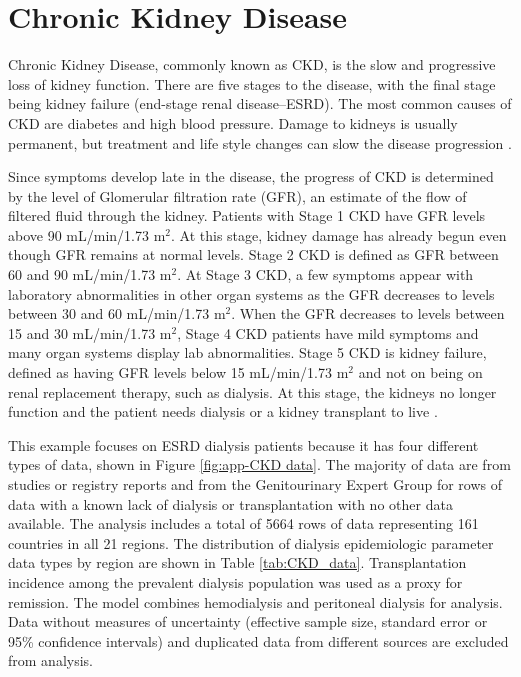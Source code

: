 \chapter{Chronic Kidney Disease}
\label{applications-fits_incon_v_con}

Chronic Kidney Disease, commonly known as CKD, is the slow and progressive loss of kidney function. There are five stages to the disease, with the final stage being kidney failure (end-stage renal disease--ESRD). The most common causes of CKD are diabetes and high blood pressure.  Damage to kidneys is usually permanent, but treatment and life style changes can slow the disease progression \cite{national_KDOQI_2002}.

Since symptoms develop late in the disease, the progress of CKD is determined by the level of Glomerular filtration rate (GFR), an estimate of the flow of filtered fluid through the kidney. Patients with Stage 1 CKD have GFR levels above 90 mL/min/1.73 m$^2$.  At this stage, kidney damage has already begun even though GFR remains at normal levels.   Stage 2 CKD is defined as GFR between 60 and 90 mL/min/1.73 m$^2$.  At Stage 3 CKD, a few symptoms appear with laboratory abnormalities in other organ systems as the GFR decreases to levels between 30 and 60 mL/min/1.73 m$^2$.  When the GFR decreases to levels between 15 and 30 mL/min/1.73 m$^2$, Stage 4 CKD patients have mild symptoms and many organ systems display lab abnormalities.  Stage 5 CKD is kidney failure, defined as having GFR levels below 15 mL/min/1.73 m$^2$ and not on being on renal replacement therapy, such as dialysis.  At this stage, the kidneys no longer function and the patient needs dialysis or a kidney transplant to live \cite{national_KDOQI_2002}.

This example focuses on ESRD dialysis patients because it has four different types of data, shown in Figure \ref{fig:app-CKD data}.  The majority of data are from studies or registry reports and from the Genitourinary Expert Group for rows of data with a known lack of dialysis or transplantation with no other data available.  The analysis includes a total of 5664 rows of data representing 161 countries in all 21 regions.  The distribution of dialysis epidemiologic parameter data types by region are shown in Table \ref{tab:CKD_data}.  Transplantation incidence among the prevalent dialysis population was used as a proxy for remission.  The model combines hemodialysis and peritoneal dialysis for analysis.  Data without measures of uncertainty (effective sample size, standard error or 95\% confidence intervals) and duplicated data from different sources are excluded from analysis.


